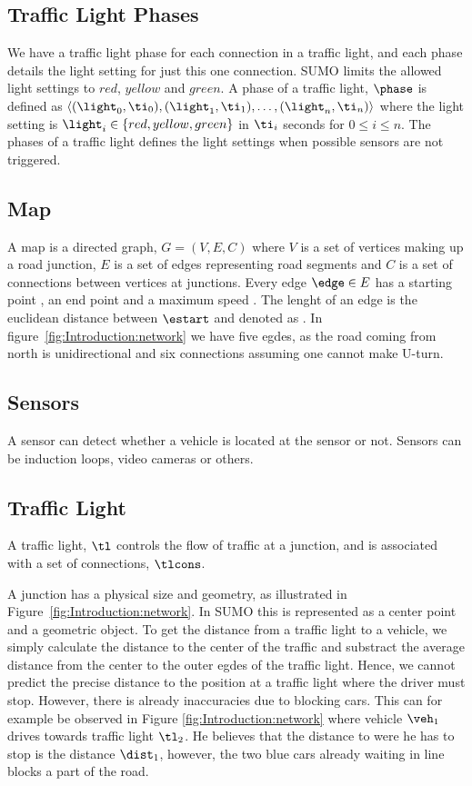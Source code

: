 \subsection{Traffic Light Phases}
We have a traffic light phase for each connection in a traffic light, and each phase details the light setting for just this one connection.
SUMO limits the allowed light settings to $red$, $yellow$ and $green$.
A phase of a traffic light, $\phase$ is defined as $\langle(\light_0, \ti_0),(\light_1, \ti_1),\dots, (\light_n, \ti_n) \rangle$ where the light setting is $\light_i\in \{red, yellow, green\}$ in $\ti_i$ seconds for $0 \leq i \leq n$.
The phases of a traffic light defines the light settings when possible sensors are not triggered.


\subsection{Map}
A map is a directed graph, $G = (V, E, C)$ where $V$ is a set of vertices making up a road junction, $E$ is a set of edges representing road segments and $C$ is a set of connections between vertices at junctions.
Every edge $\edge\in E$ has a starting point \estart, an end point \eend and a maximum speed \espeed. 
The lenght of an edge is the euclidean distance between $\estart$ and \eend denoted as \elength.
In figure~\ref{fig:Introduction:network} we have five egdes, as the road coming from north is unidirectional and six connections assuming one cannot make U-turn.

\subsection{Sensors}
A sensor can detect whether a vehicle is located at the sensor or not. Sensors can be induction loops, video cameras or others.

\subsection{Traffic Light}
A traffic light, $\tl$ controls the flow of traffic at a junction, and is associated with a set of connections, $\tlcons$. %

A junction has a physical size and geometry, as illustrated in Figure~\ref{fig:Introduction:network}.
In SUMO this is represented as a center point and a geometric object.
To get the distance from a traffic light to a vehicle, we simply calculate the distance to the center of the traffic and substract the average distance from the center to the outer egdes of the traffic light. 
Hence, we cannot predict the precise distance to the position at a traffic light where the driver must stop.
However, there is already inaccuracies due to blocking cars.
This can for example be observed in Figure \ref{fig:Introduction:network} where vehicle $\veh_1$ drives towards traffic light $\tl_2$. %
He believes that the distance to were he has to stop is the distance $\dist_1$, however, the two blue cars already waiting in line blocks a part of the road.

